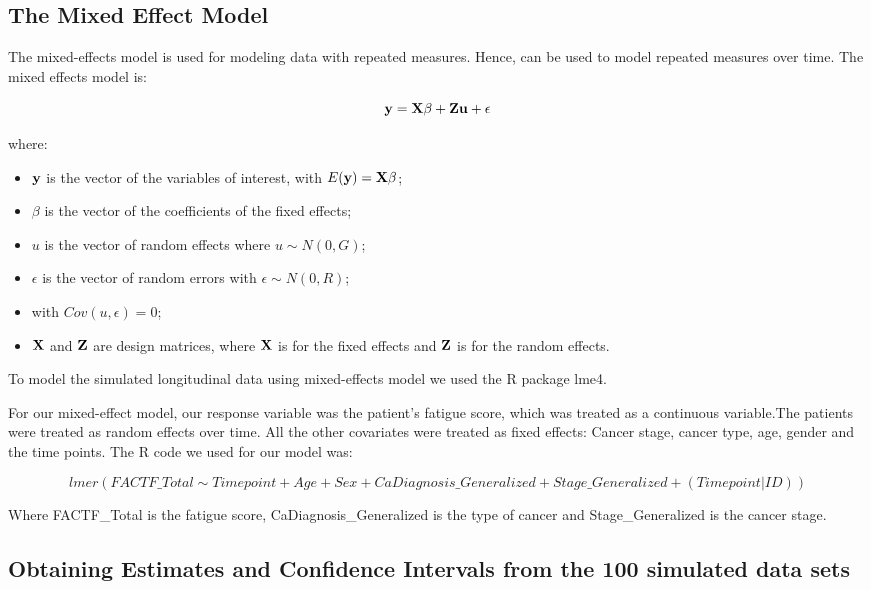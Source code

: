 \documentclass[fleqn,10pt]{wlscirep}\usepackage[]{graphicx}\usepackage[]{color}
\begin{document}
\subsection{The Mixed Effect Model}

The mixed-effects model is used for modeling data with repeated measures. Hence, can be used to model repeated measures over time. The mixed effects model is:

$$\bold{y} = \bold{X \beta + Zu + \epsilon}$$


where:

\begin{itemize}
\item $\bold{y}$ is the vector of the variables of interest, with $E(\bold{y}) = \bold{X\beta}$;
\item $\beta$ is the vector of the coefficients of the fixed effects;
\item $u$ is the vector of random effects where $u \sim N(0, G)$;
\item $\epsilon$ is the vector of random errors with $\epsilon \sim N(0, R)$;
\item with $Cov(u,\epsilon) = 0$;
\item  $\bold{X}$ and $\bold{Z}$ are design matrices, where $\bold{X}$ is for the fixed effects and $\bold{Z}$ is for the random effects. 
\end{itemize}


To model the simulated longitudinal data using mixed-effects model we used the R package lme4. 


For our mixed-effect model, our response variable was the patient's fatigue score, which was treated as a continuous variable.The patients were treated as random effects over time. All the other covariates were treated as fixed effects: Cancer stage, cancer type, age, gender and the time points. The R code we used for our model was: 

$$lmer(FACTF\_Total \sim Timepoint + Age + Sex + CaDiagnosis\_Generalized + Stage\_Generalized + (Timepoint|ID))$$

Where FACTF\_Total is the fatigue score, CaDiagnosis\_Generalized is the type of cancer and Stage\_Generalized is the cancer stage. 

\subsection{Obtaining Estimates and Confidence Intervals from the 100 simulated data sets}
\end{document}
